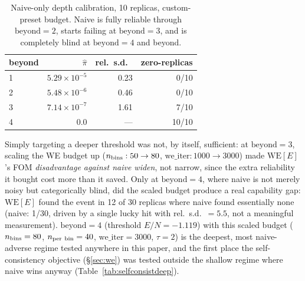 \documentclass[a4paper,fleqn]{cas-sc}
\begin{document}
	\begin{table}[H]
		\centering\small
		\caption{Naive-only depth calibration, 10 replicas, custom-preset budget. Naive is
			fully reliable through $\mathrm{beyond}=2$, starts failing at $\mathrm{beyond}=3$,
			and is completely blind at $\mathrm{beyond}=4$ and beyond.}
		\label{tab:deeprare}
		\begin{tabular}{lrrr}
			\toprule
			beyond & $\hat\pi$ & rel.\ s.d.\ & zero-replicas \\
			\midrule
			1 & $5.29\times10^{-5}$ & 0.23 & 0/10 \\
			2 & $5.48\times10^{-6}$ & 0.46 & 0/10 \\
			3 & $7.14\times10^{-7}$ & 1.61 & 7/10 \\
			4 & $0.0$ & --- & 10/10 \\
			\bottomrule
		\end{tabular}
	\end{table}
	
	Simply targeting a deeper threshold was not, by itself, sufficient: at $\mathrm{beyond}=3$,
	scaling the WE budget up ($n_{\rm bins}:50\to80$, $\mathrm{we\_iter}:1000\to3000$) made
	$\mathrm{WE}[E]$'s FOM \emph{disadvantage against naive widen}, not narrow, since the
	extra reliability it bought cost more than it saved. Only at $\mathrm{beyond}=4$, where
	naive is not merely noisy but categorically blind, did the scaled budget produce a real
	capability gap: $\mathrm{WE}[E]$ found the event in 12 of 30 replicas where naive found
	essentially none (naive: 1/30, driven by a single lucky hit with rel.\ s.d.\ $=5.5$, not
	a meaningful measurement). $\mathrm{beyond}=4$ (threshold $E/N=-1.119$) with this scaled
	budget ($n_{\rm bins}=80$, $n_{\rm per\ bin}=40$, $\mathrm{we\_iter}=3000$, $\tau=2$) is
	the deepest, most naive-adverse regime tested anywhere in this paper, and the first
	place the self-consistency objective (\S\ref{sec:we}) was tested outside the
	shallow regime where naive wins anyway (Table~\ref{tab:selfconsistdeep}).
	
\end{document}
